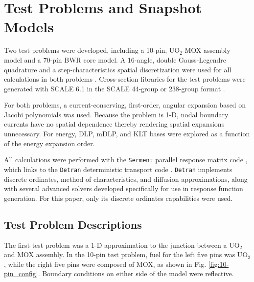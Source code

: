 \documentclass[5p,times,twocolumn,10pt]{elsarticle}
\begin{document}
  
  \section{Test Problems and Snapshot Models}
  \label{sec:testproblems}
  Two test problems were developed, including a 10-pin, UO$_2$-MOX assembly model and a 70-pin BWR core model.
  A 16-angle, double Gauss-Legendre quadrature and a step-characteristics spatial 
  discretization were used for all calculations in both problems \cite{Roberts2014}.  Cross-section libraries for the test problems were generated
  with SCALE 6.1 in the SCALE 44-group or 238-group format \cite{Scale}.
  
  For both problems, a current-conserving, first-order, angular expansion based on Jacobi polynomials \cite{Roberts2014}
  was used.  Because the problem is 1-D, nodal boundary currents have no spatial dependence thereby rendering spatial
  expansions unnecessary. For energy, DLP, mDLP, and KLT bases were explored as a function of the energy expansion order.
  
  All calculations were performed with the {\tt Serment} parallel response matrix code \cite{RobertsSerment}, 
  which links to the {\tt Detran} deterministic transport code \cite{RobertsDetran}. {\tt Detran} implements
  discrete ordinates, method of characteristics, and diffusion approximations, along with several advanced
  solvers developed specifically for use in response function generation. For this paper, only its discrete
  ordinates capabilities were used.
  
  \subsection{Test Problem Descriptions}
  The first test problem was a 1-D approximation to the junction between a UO$_2$ and MOX assembly.  
  In the 10-pin test problem, fuel for the left five pins was UO$_2$, while the right five pins were composed of MOX, as shown in 
  Fig. \ref{fig:10-pin_config}. Boundary conditions on either side of the model were reflective. 
  
\end{document}
